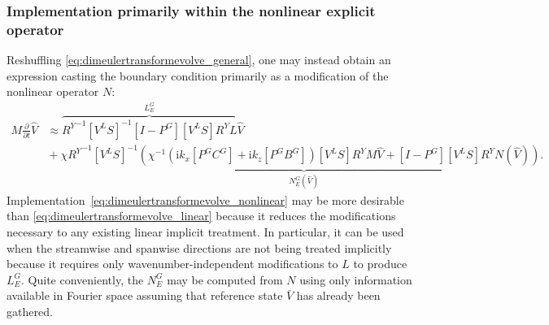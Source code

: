 \documentclass[letterpaper,11pt,nointlimits,reqno,draft]{amsbook}
\newcommand{\ii}{\ensuremath{\mathrm{i}}}
\begin{document}
\subsubsection{Implementation primarily within the nonlinear explicit operator}
\label{sec:nrbc_mostly_explicit}

Reshuffling \eqref{eq:dimeulertransformevolve_general}, one may instead obtain
an expression casting the boundary condition primarily as a modification of the
nonlinear operator $N$:
\begin{align}
\label{eq:dimeulertransformevolve_nonlinear}
  M \frac{\partial}{\partial{}t}
  \hat{V}
&\approx
\overbrace{
  {R^Y}^{-1}
  \left[V^L S\right]^{-1}
  \left[I-P^G\right] \left[V^L S\right] R^Y
  L
}^{L_E^G}
  \hat{V}
\\
&{}+
  \chi
\underbrace{
  {R^Y}^{-1}
  \left[V^L S\right]^{-1}
  \left(
    \chi^{-1}
    \left( \ii k_x \left[P^G C^G\right] + \ii k_z \left[P^G B^G\right] \right)
    \left[V^L S\right] R^Y M
    \hat{V}
    +
    \left[I - P^G\right] \left[V^L S\right] R^Y
    N(\hat{V})
  \right)
}_{N_E^G\left(\hat{V}\right)}
.
\end{align}
Implementation~\eqref{eq:dimeulertransformevolve_nonlinear} may be more
desirable than \eqref{eq:dimeulertransformevolve_linear} because it reduces the
modifications necessary to any existing linear implicit treatment. In
particular, it can be used when the streamwise and spanwise directions are not
being treated implicitly because it requires only wavenumber-independent
modifications to $L$ to produce $L_E^G$.
Quite conveniently, the $N_E^G$ may be computed from $N$ using only information
available in Fourier space assuming that reference state $\bar{V}$ has already
been gathered.
\end{document}
